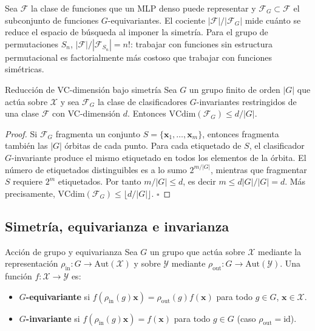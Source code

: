 Sea $\mathcal{F}$ la clase de funciones que un MLP denso puede representar y
$\mathcal{F}_G \subset \mathcal{F}$ el subconjunto de funciones $G$-equivariantes.
El cociente $|\mathcal{F}|/|\mathcal{F}_G|$ mide cuánto se reduce el espacio de
búsqueda al imponer la simetría. Para el grupo de permutaciones $S_n$,
$|\mathcal{F}|/|\mathcal{F}_{S_n}| = n!$: trabajar con funciones sin
estructura permutacional es factorialmente más costoso que trabajar con funciones
simétricas.

\begin{proposicion}{Reducción de VC-dimensión bajo simetría}
\label{prop:vc_simetria}
Sea $G$ un grupo finito de orden $|G|$ que actúa sobre $\mathcal{X}$ y sea
$\mathcal{F}_G$ la clase de clasificadores $G$-invariantes restringidos de una
clase $\mathcal{F}$ con VC-dimensión $d$. Entonces
$\mathrm{VCdim}(\mathcal{F}_G) \leq d/|G|$.
\end{proposicion}

\begin{proof}
Si $\mathcal{F}_G$ fragmenta un conjunto $S = \{\bm{x}_1,\ldots,\bm{x}_m\}$,
entonces fragmenta también las $|G|$ órbitas de cada punto. Para cada etiquetado
de $S$, el clasificador $G$-invariante produce el mismo etiquetado en todos los
elementos de la órbita. El número de etiquetados distinguibles es a lo sumo
$2^{m/|G|}$, mientras que fragmentar $S$ requiere $2^m$ etiquetados. Por tanto
$m/|G| \leq d$, es decir $m \leq d|G|/|G| = d$. Más precisamente,
$\mathrm{VCdim}(\mathcal{F}_G) \leq \lfloor d/|G| \rfloor$. $\square$
\end{proof}

\subsection{Simetría, equivarianza e invarianza}
\label{subsec:equivarianza}

\begin{definicion}{Acción de grupo y equivarianza}
\label{def:equivarianza}
Sea $G$ un grupo que actúa sobre $\mathcal{X}$ mediante la representación
$\rho_{\mathrm{in}}: G \to \mathrm{Aut}(\mathcal{X})$ y sobre $\mathcal{Y}$
mediante $\rho_{\mathrm{out}}: G \to \mathrm{Aut}(\mathcal{Y})$.
Una función $f: \mathcal{X} \to \mathcal{Y}$ es:
\begin{itemize}
  \item \textbf{$G$-equivariante} si $f(\rho_{\mathrm{in}}(g)\bm{x})
        = \rho_{\mathrm{out}}(g)f(\bm{x})$ para todo $g \in G$,
        $\bm{x} \in \mathcal{X}$.
  \item \textbf{$G$-invariante} si $f(\rho_{\mathrm{in}}(g)\bm{x})
        = f(\bm{x})$ para todo $g \in G$ (caso $\rho_{\mathrm{out}} = \mathrm{id}$).
\end{itemize}
\end{definicion}

